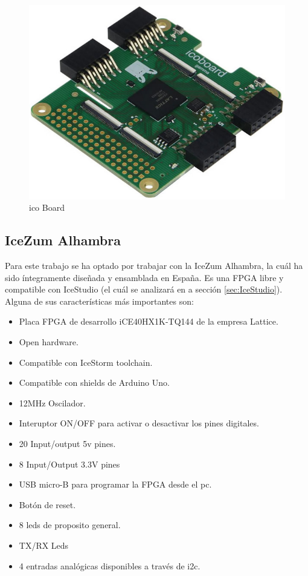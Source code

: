 \begin{center}
	\begin{figure}[H]
		\center
		\includegraphics[trim = 0mm 0mm 0mm 0mm, clip,scale=0.3]{imagenes/EstadoArte/ico_board.jpg}
		\caption{ico Board}
		\label{fig:icoBoard}
	\end{figure}
\end{center}
\subsection{IceZum Alhambra}
Para este trabajo se ha optado por trabajar con la IceZum Alhambra, la cuál ha sido íntegramente diseñada y ensamblada en España.\newline
Es una FPGA libre y compatible con IceStudio (el cuál se analizará en a sección \ref{sec:IceStudio}). Alguna de sus características más importantes son:
\begin{itemize}
	\item Placa FPGA de desarrollo iCE40HX1K-TQ144 de la empresa Lattice. 
	\item Open hardware.
	\item Compatible con IceStorm toolchain.
	\item Compatible con shields de Arduino Uno. 
	\item 12MHz Oscilador.
	\item Interuptor ON/OFF para activar o desactivar los pines digitales.
	\item 20 Input/output 5v pines.
	\item 8 Input/Output 3.3V pines
	\item USB micro-B para programar la FPGA desde el pc.
	\item Botón de reset.
	\item 8 leds de proposito general.
	\item TX/RX Leds
	\item 4 entradas analógicas disponibles a través de i2c.
\end{itemize}

